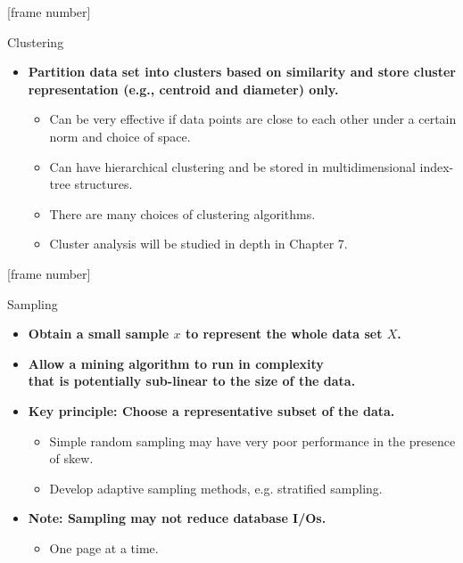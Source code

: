 \documentclass[aspectratio=169,t]{beamer}
\begin{document}
  {
    [frame number]
    \begin{frame}{Clustering}
    \begin{itemize}
      \item \textbf{Partition data set into clusters based on similarity and store cluster representation (e.g., centroid and diameter) only.}
      \begin{itemize}
        \item Can be very effective if data points are close to each other under a certain norm and choice of space.
        \item Can have hierarchical clustering and be stored in multidimensional index-tree structures.
        \item There are many choices of clustering algorithms.
        \item Cluster analysis will be studied in depth in Chapter 7.
      \end{itemize}
    \end{itemize}
    \end{frame}
  }

  {
    [frame number]
    \begin{frame}{Sampling}
    \begin{itemize}
      \item \textbf{Obtain a small sample $x$ to represent the whole data set $X$.}
      \item \textbf{Allow a mining algorithm to run in complexity \\ that is potentially sub-linear to the size of the data.}
      \item \textbf{Key principle: Choose a {\color{airforceblue}representative} subset of the data.}
      \begin{itemize}
        \item Simple random sampling may have very poor performance in the presence of skew.
        \item Develop adaptive sampling methods, e.g. stratified sampling.
      \end{itemize}
      \item \textbf{Note: Sampling may not reduce database I/Os.}
      \begin{itemize}
        \item One page at a time.
      \end{itemize}
    \end{itemize}
    \end{frame}
  }
\end{document}
